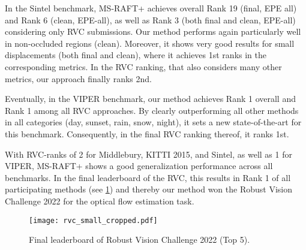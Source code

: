 \documentclass[conference,compsoc,a4paper]{IEEEtran}[2015/08/26]
\begin{document}
In the Sintel benchmark, MS-RAFT+ achieves overall Rank 19 (final, EPE all) and Rank 6 (clean, EPE-all), as well as Rank 3 (both final and clean, EPE-all) considering only RVC submissions.
Our method performs again particularly well in non-occluded regions (clean). Moreover, it shows very good results for small displacements (both final and clean), where it achieves 1st ranks in the corresponding metrics.
In the RVC ranking, 
that also considers many other metrics, our approach finally ranks 2nd.

Eventually, in the VIPER benchmark, our method achieves Rank 1 overall and Rank 1 among all RVC approaches. By clearly outperforming all other methods in all categories (day, sunset, rain, snow, night), it sets a new state-of-the-art for this benchmark. Consequently, in the final RVC ranking thereof, it ranks 1st.


With RVC-ranks of 2 for Middlebury, KITTI 2015, and Sintel, as well as 1 for VIPER, MS-RAFT+ shows a good generalization performance across all benchmarks. In the final leaderboard of the RVC, this results in Rank 1 of all participating methods (see \cref{fig:leaderboard}) and thereby our method won the Robust Vision Challenge 2022 for the optical flow estimation task.

\begin{figure}
    \centering
       \texttt{[image: rvc\_small\_cropped.pdf]}
    \caption{Final leaderboard of Robust Vision Challenge 2022 (Top 5).} 
    \label{fig:leaderboard}
\end{figure}








 
\end{document}
